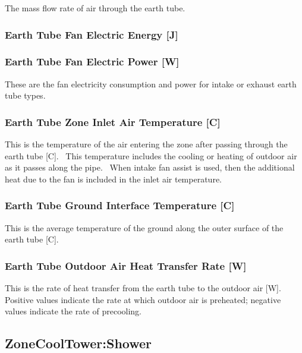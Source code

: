 The mass flow rate of air through the earth tube.

\subsubsection{Earth Tube Fan Electric Energy {[}J{]}}\label{earth-tube-fan-electric-energy-j}

\subsubsection{Earth Tube Fan Electric Power {[}W{]}}\label{earth-tube-fan-electric-power-w}

These are the fan electricity consumption and power for intake or exhaust earth tube types.

\subsubsection{Earth Tube Zone Inlet Air Temperature {[}C{]}}\label{earth-tube-zone-inlet-air-temperature-c}

This is the temperature of the air entering the zone after passing through the earth tube {[}C{]}.~ This temperature includes the cooling or heating of outdoor air as it passes along the pipe. ~When intake fan assist is used, then the additional heat due to the fan is included in the inlet air temperature.

\subsubsection{Earth Tube Ground Interface Temperature {[}C{]}}\label{earth-tube-ground-interface-temperature-c}

This is the average temperature of the ground along the outer surface of the earth tube {[}C{]}.

\subsubsection{Earth Tube Outdoor Air Heat Transfer Rate {[}W{]}}\label{earth-tube-outdoor-air-heat-transfer-rate-w}

This is the rate of heat transfer from the earth tube to the outdoor air {[}W{]}.~ Positive values indicate the rate at which outdoor air is preheated; negative values indicate the rate of precooling.

\subsection{ZoneCoolTower:Shower}\label{zonecooltowershower}

